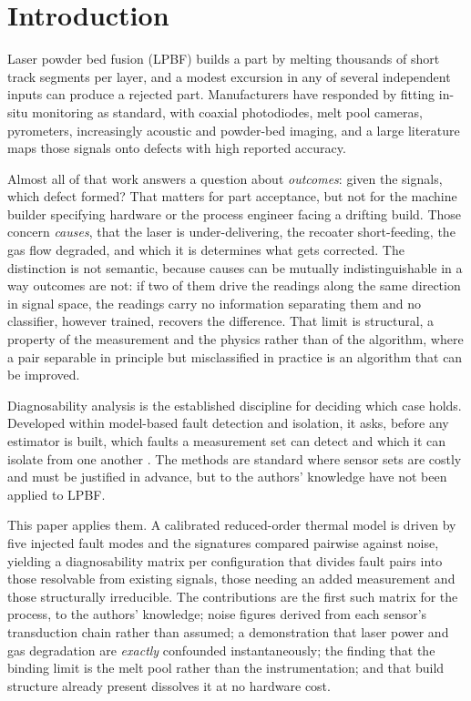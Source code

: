 \documentclass[final,5p,times,twocolumn]{elsarticle}
\begin{document}
\section{Introduction}

Laser powder bed fusion (LPBF) builds a part by melting thousands of short track
segments per layer, and a modest excursion in any of several independent inputs
can produce a rejected part. Manufacturers have responded by fitting in-situ
monitoring as standard, with coaxial photodiodes, melt pool cameras, pyrometers,
increasingly acoustic and powder-bed imaging, and a large literature maps
those signals onto defects with high reported accuracy.

Almost all of that work answers a question about \emph{outcomes}: given the
signals, which defect formed? That matters for part acceptance, but not for the
machine builder specifying hardware or the process engineer facing a drifting
build. Those concern \emph{causes}, that the laser is under-delivering, the
recoater short-feeding, the gas flow degraded, and which it is determines what
gets corrected. The distinction is not semantic, because causes can be mutually
indistinguishable in a way outcomes are not: if two of them drive the readings
along the same direction in signal space, the readings carry no information
separating them and no classifier, however trained, recovers the difference. That
limit is structural, a property of the measurement and the physics rather than of
the algorithm, where a pair separable in principle but misclassified in practice
is an algorithm that can be improved.

Diagnosability analysis is the established discipline for deciding which case
holds. Developed within model-based fault detection and isolation, it asks,
before any estimator is built, which faults a measurement set can detect and
which it can isolate from one another \cite{Krysander2008}. The methods
are standard where sensor sets are costly and must be justified in advance, but
to the authors' knowledge have not been applied to LPBF.

This paper applies them. A calibrated reduced-order thermal model is driven by
five injected fault modes and the signatures compared pairwise against noise,
yielding a diagnosability matrix per configuration that divides fault pairs into
those resolvable from existing signals, those needing an added measurement and
those structurally irreducible. The contributions are the first such matrix for
the process, to the authors' knowledge; noise figures derived from each sensor's
transduction chain rather than assumed; a demonstration that laser power and gas
degradation are \emph{exactly} confounded instantaneously; the finding that the
binding limit is the melt pool rather than the instrumentation; and that build
structure already present dissolves it at no hardware cost.
\end{document}
